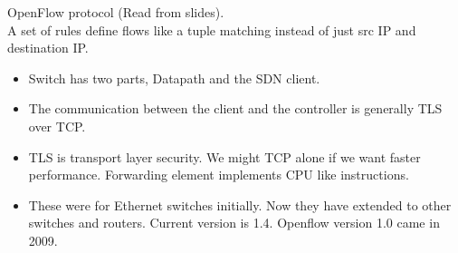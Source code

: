 \documentclass[solution,addpoints,12pt]{exam}
\begin{document}
OpenFlow protocol (Read from slides).\\
A set of rules define flows like a tuple matching instead
of just src IP and destination IP.\\
\begin{itemize}
\item Switch has two parts, Datapath and the SDN client.
\item The communication between the client and the controller
is generally TLS over TCP.
\item TLS is transport layer security. We might TCP alone if we want
faster performance. Forwarding element implements CPU like instructions.
\item These were for Ethernet switches initially. Now they have
extended to other switches and routers. Current version is 1.4.
Openflow version 1.0 came in 2009.
\end{itemize}
\end{document}
